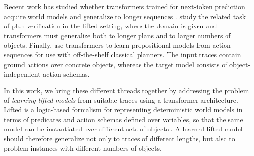 





Recent work has studied whether transformers trained for next-token prediction acquire world models
\citep{Toshniwal_Wiseman_Livescu_Gimpel_2022,li_iclr,nanda2023linear,world-models2,vafa2025what}
and generalize to longer sequences
\citep{kazemnejad2023impact,zhou2024algorithms,huang2025formal}.
\citet{sarrof2026verify} study the related task of plan verification in the lifted \strips setting, where the domain is given and transformers must generalize both to longer plans and to larger numbers of objects. 
Finally, \citet{nunez2026strips} use transformers to learn propositional \strips models from action sequences for use with off-the-shelf classical planners. %
The input traces contain ground actions over concrete objects, whereas the target model consists of object-independent action schemas.


In this work, we bring these different threads together by addressing the problem of
\emph{learning lifted \strips models} from suitable traces using a transformer architecture.
Lifted \strips is a logic-based formalism for representing deterministic world models in terms of predicates and
action schemas defined over variables, so that the same model can be instantiated over
different sets of objects
\citep{ghallab:book,geffner:book}.
A learned lifted model should therefore generalize not only to traces of different lengths, but also to problem instances with different numbers of objects.


